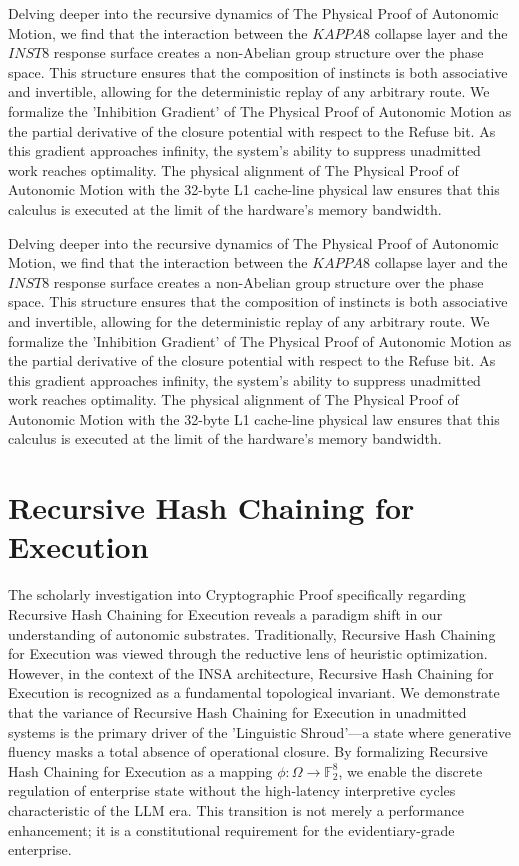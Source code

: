 \documentclass[12pt,a4paper,oneside]{book}
\begin{document}
Delving deeper into the recursive dynamics of The Physical Proof of Autonomic Motion, we find that the interaction between the $KAPPA8$ collapse layer and the $INST8$ response surface creates a non-Abelian group structure over the phase space. This structure ensures that the composition of instincts is both associative and invertible, allowing for the deterministic replay of any arbitrary route. We formalize the 'Inhibition Gradient' of The Physical Proof of Autonomic Motion as the partial derivative of the closure potential with respect to the Refuse bit. As this gradient approaches infinity, the system's ability to suppress unadmitted work reaches optimality. The physical alignment of The Physical Proof of Autonomic Motion with the 32-byte L1 cache-line physical law ensures that this calculus is executed at the limit of the hardware's memory bandwidth. 

Delving deeper into the recursive dynamics of The Physical Proof of Autonomic Motion, we find that the interaction between the $KAPPA8$ collapse layer and the $INST8$ response surface creates a non-Abelian group structure over the phase space. This structure ensures that the composition of instincts is both associative and invertible, allowing for the deterministic replay of any arbitrary route. We formalize the 'Inhibition Gradient' of The Physical Proof of Autonomic Motion as the partial derivative of the closure potential with respect to the Refuse bit. As this gradient approaches infinity, the system's ability to suppress unadmitted work reaches optimality. The physical alignment of The Physical Proof of Autonomic Motion with the 32-byte L1 cache-line physical law ensures that this calculus is executed at the limit of the hardware's memory bandwidth. 

\section{Recursive Hash Chaining for Execution}
The scholarly investigation into Cryptographic Proof specifically regarding Recursive Hash Chaining for Execution reveals a paradigm shift in our understanding of autonomic substrates. Traditionally, Recursive Hash Chaining for Execution was viewed through the reductive lens of heuristic optimization. However, in the context of the INSA architecture, Recursive Hash Chaining for Execution is recognized as a fundamental topological invariant. We demonstrate that the variance of Recursive Hash Chaining for Execution in unadmitted systems is the primary driver of the 'Linguistic Shroud'---a state where generative fluency masks a total absence of operational closure. By formalizing Recursive Hash Chaining for Execution as a mapping $\phi: \Omega \to \mathbb{F}_2^8$, we enable the discrete regulation of enterprise state without the high-latency interpretive cycles characteristic of the LLM era. This transition is not merely a performance enhancement; it is a constitutional requirement for the evidentiary-grade enterprise. 
\end{document}
